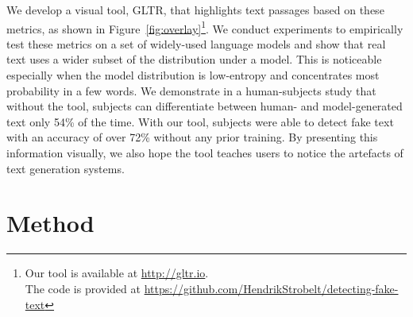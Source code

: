 \documentclass[11pt,a4paper]{article}
\begin{document}
We develop a visual tool, GLTR, that highlights text passages based on these metrics, as shown in Figure~\ref{fig:overlay}\footnote{Our tool is available at \url{http://gltr.io}. \\The code is provided at \url{https://github.com/HendrikStrobelt/detecting-fake-text}}.
We conduct experiments to empirically test these metrics on a set of widely-used language models and show that real text uses a wider subset of the distribution under a model. This is noticeable especially when the model distribution is low-entropy and concentrates most probability in a few words. We demonstrate in a human-subjects study that without the tool, subjects can differentiate between human- and model-generated text only 54\% of the time. With our tool, subjects were able to detect fake text with an accuracy of over 72\% without any prior training. By presenting this information visually, we also hope the tool teaches users to notice the artefacts of text generation systems.


\section{Method}
\label{sec:analy}
\end{document}
